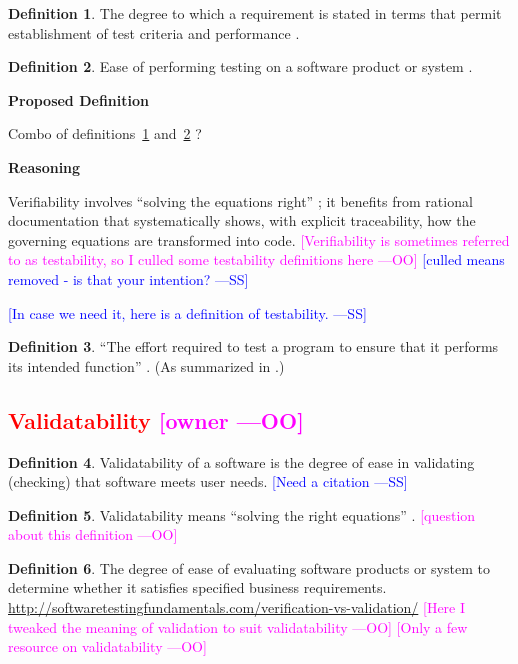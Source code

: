 \documentclass[letterpaper,cleveref]{lipics-v2019}
\newcommand{\authornote}[3]{\textcolor{#1}{[#3 ---#2]}}
\newcommand{\authornote}[3]{}
\newcommand{\wss}[1]{\authornote{blue}{SS}{#1}} %
\newcommand{\oo}[1]{\authornote{magenta}{OO}{#1}} %
\newcommand{\notdone}[1]{\textcolor{red}{#1}}
\theoremstyle{definition}
\newtheorem{defn}{Definition}
\begin{document}
\begin{defn} \label{Defn_Verifiability1}
  The degree to which a requirement is stated in terms that permit establishment
  of test criteria and performance \citep{IEEEStdGlossarySET1990}.
\end{defn}

\begin{defn} \label{Defn_Verifiability2}
  Ease of performing testing on a software product or system
  \citep{IEEEStdGlossarySET1990}.
\end{defn}

\noindent \textbf{Proposed Definition}

Combo of definitions~\ref{Defn_Verifiability1} and~\ref{Defn_Verifiability2} ?

\noindent \textbf{Reasoning}

Verifiability involves ``solving the equations right'' \citep[p.~23]{Roache1998};
it benefits from rational documentation that systematically shows, with explicit
traceability, how the governing equations are transformed into code.
\oo{Verifiability is sometimes referred to as testability, so I culled some
  testability definitions here}  \wss{culled means removed - is that your
  intention?}

\wss{In case we need it, here is a definition of testability.}

\begin{defn}
  ``The effort required to test a program to ensure that it performs its
  intended function'' \citep{McCallEtAl1977}. (As summarized in
  \citet{VanVliet2000}.)
\end{defn}


\subsection{\notdone{Validatability} \oo{owner}}

\begin{defn}
  Validatability of a software is the degree of ease in validating (checking)
  that software meets user needs. \wss{Need a citation}
\end{defn}

\begin{defn}
  Validatability means ``solving the right equations'' \citep[p.~23]{Roache1998}.
  \oo{question about this definition}
\end{defn}

\begin{defn} \label{DefnValidatability}
  The degree of ease of evaluating software products or system to determine
  whether it satisfies specified business
  requirements. \url{http://softwaretestingfundamentals.com/verification-vs-validation/}
  \oo{Here I tweaked the meaning of validation to suit validatability} \oo{Only
    a few resource on validatability}
\end{defn}
\end{document}
